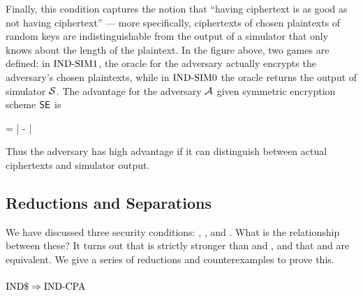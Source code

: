 

Finally, this condition captures the notion that ``having ciphertext is as good
as not having ciphertext'' --- more specifically, ciphertexts of chosen
plaintexts of random keys are indistinguishable from the output of a simulator
that only knows about the length of the plaintext. In the figure above, two
games are defined: in $\textnormal{IND-SIM}1$, the oracle for the adversary actually
encrypts the adversary's chosen plaintexts, while in $\textnormal{IND-SIM}0$ the oracle
returns the output of simulator ${\cal S}$. The advantage for the adversary
${\mathcal A}$ given symmetric encryption scheme $\textnormal{\textsf{SE}}$ is

\bnm
\AdvINDSIM{\SE,\simu}{\advA} = 
    \left| -  \right| 
\enm

Thus the adversary has high advantage if it can distinguish between
actual ciphertexts and simulator output.

\subsection{Reductions and Separations}
\label{sec:randomenc-reduct}

We have discussed three security conditions: \INDRAND, \INDCPA, and \INDSIM.
What is the relationship between these? It turns out that \INDRAND is
strictly stronger than \INDCPA and \INDSIM, and that \INDCPA and \INDSIM are
equivalent. We give a series of reductions and counterexamples to prove this.

\subsubsection*{$\textnormal{IND\$} \Rightarrow \textnormal{IND-CPA}$}

